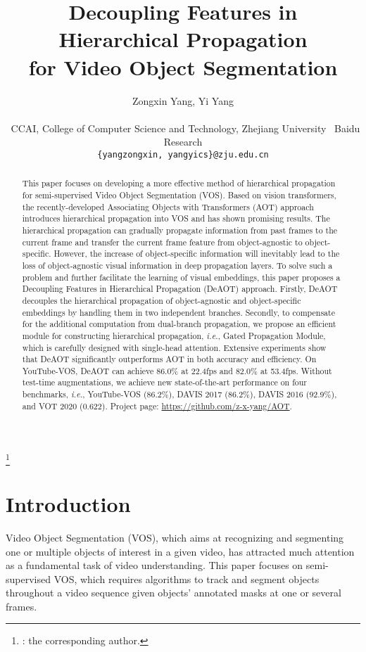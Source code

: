 \documentclass{article}
\title{Decoupling Features in Hierarchical Propagation \\ for Video Object Segmentation}
\author{Zongxin Yang, Yi Yang \\
  \\
  ~CCAI, College of Computer Science and Technology, Zhejiang University \hspace{1mm}~Baidu Research\\
  \texttt{\{yangzongxin, yangyics\}@zju.edu.cn} \\
}
\def\ie{\emph{i.e.}}
\begin{document}
\maketitle

\let\thefootnote\relax\footnote{: the corresponding author.}

\begin{abstract}
This paper focuses on developing a more effective method of hierarchical propagation for semi-supervised Video Object Segmentation (VOS). Based on vision transformers, the recently-developed Associating Objects with Transformers (AOT) approach introduces hierarchical propagation into VOS and has shown promising results. The hierarchical propagation can gradually propagate information from past frames to the current frame and transfer the current frame feature from object-agnostic to object-specific. However, the increase of object-specific information will inevitably lead to the loss of object-agnostic visual information in deep propagation layers. To solve such a problem and further facilitate the learning of visual embeddings, this paper proposes a Decoupling Features in Hierarchical Propagation (DeAOT) approach. Firstly, DeAOT decouples the hierarchical propagation of object-agnostic and object-specific embeddings by handling them in two independent branches. Secondly, to compensate for the additional computation from dual-branch propagation, we propose an efficient module for constructing hierarchical propagation, \ie, Gated Propagation Module, which is carefully designed with single-head attention. Extensive experiments show that DeAOT significantly outperforms AOT in both accuracy and efficiency. On YouTube-VOS, DeAOT can achieve 86.0\% at 22.4fps and 82.0\% at 53.4fps. Without test-time augmentations, we achieve new state-of-the-art performance on four benchmarks, \ie, YouTube-VOS (86.2\%), DAVIS 2017 (86.2\%), DAVIS 2016 (92.9\%), and VOT 2020 (0.622). Project page: \url{https://github.com/z-x-yang/AOT}.
\end{abstract} 
\section{Introduction}\label{sec:introduction}
Video Object Segmentation (VOS), which aims at recognizing and segmenting one or multiple objects of interest in a given video, has attracted much attention as a fundamental task of video understanding. This paper focuses on semi-supervised VOS, which requires algorithms to track and segment objects throughout a video sequence given objects' annotated masks at one or several frames. 
\end{document}
